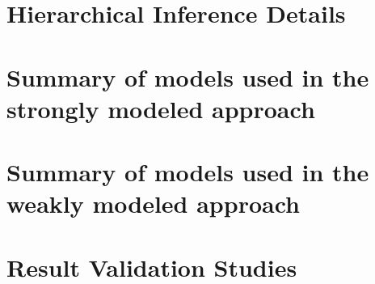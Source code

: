 \section{Hierarchical Inference Details}\label{appendix:technical_details}


\section{Summary of models used in the strongly modeled approach}\label{appendix:parametric_models_summary}


\section{Summary of models used in the weakly modeled approach}\label{appendix:non_parametric_models_summary}


\section{Result Validation Studies}\label{appendix:model_comparison}

